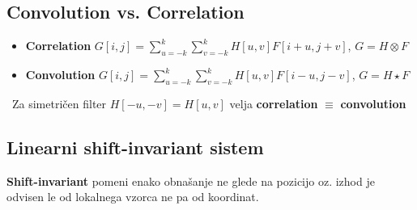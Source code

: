 \documentclass[11pt]{article}
\begin{document}
\newpage

\subsection{Convolution vs. Correlation}
\begin{itemize}
\item \textbf{Correlation} $G[i, j] = \sum\limits_{u=-k}^k\sum\limits_{v=-k}^kH[u, v]F[i+u, j+v]$, $G = H \otimes F$
\item \textbf{Convolution} $G[i, j] = \sum\limits_{u=-k}^k\sum\limits_{v=-k}^kH[u, v]F[i-u, j-v]$,
$G = H \star F$
\end{itemize}
\
Za simetri\v{c}en filter $H[-u, -v] = H[u, v]$ velja  \textbf{correlation} $\equiv$ \textbf{convolution}

\subsection{Linearni shift-invariant sistem}
\textbf{Shift-invariant} pomeni enako obna\v{s}anje ne glede na pozicijo oz. izhod je odvisen le od lokalnega vzorca ne pa od koordinat.
\end{document}
